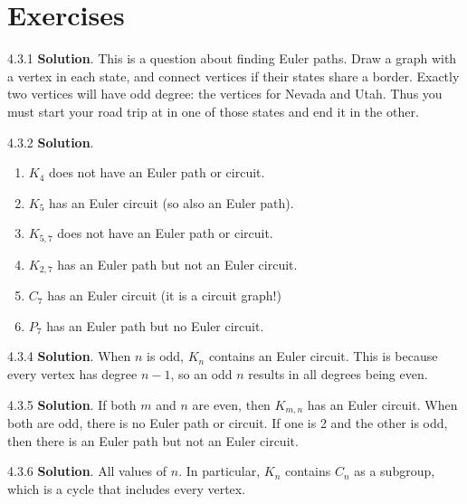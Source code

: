 \documentclass[11pt,]{book}
\theoremstyle{ptxplainnotitle}
\theoremstyle{ptxplaintitle}
\theoremstyle{ptxdefinitionnotitle}
\theoremstyle{ptxdefinitiontitle}
\theoremstyle{ptxdefinitionnotitle}
\theoremstyle{ptxdefinitiontitle}
\theoremstyle{ptxdefinitionnotitle}
\theoremstyle{ptxdefinitiontitle}
\theoremstyle{ptxdefinitiontitlenonumber}
\theoremstyle{ptxdefinitiontitlenonumber}
\numberwithin{equation}{chapter}
\begin{document}
\section*{Exercises}
\begin{divisionexercise}{4.3.1}
\textbf{Solution}.\quad%
\hypertarget{p-2746}{}%
This is a question about finding Euler paths. Draw a graph with a vertex in each state, and connect vertices if their states share a border. Exactly two vertices will have odd degree: the vertices for Nevada and Utah. Thus you must start your road trip at in one of those states and end it in the other.%
\end{divisionexercise}%
\begin{divisionexercise}{4.3.2}
\textbf{Solution}.\quad%
\hypertarget{p-2748}{}%
\leavevmode%
\begin{enumerate}[label=(\alph*)]
\item\hypertarget{li-1326}{}\(K_4\) does not have an Euler path or circuit.%
\item\hypertarget{li-1327}{}\(K_5\) has an Euler circuit (so also an Euler path).%
\item\hypertarget{li-1328}{}\(K_{5,7}\) does not have an Euler path or circuit.%
\item\hypertarget{li-1329}{}\(K_{2,7}\) has an Euler path but not an Euler circuit.%
\item\hypertarget{li-1330}{}\(C_7\) has an Euler circuit (it is a circuit graph!)%
\item\hypertarget{li-1331}{}\(P_7\) has an Euler path but no Euler circuit.%
\end{enumerate}
%
\end{divisionexercise}%
\begin{divisionexercise}{4.3.4}
\textbf{Solution}.\quad%
\hypertarget{p-2755}{}%
When \(n\) is odd, \(K_n\) contains an Euler circuit. This is because every vertex has degree \(n-1\), so an odd \(n\) results in all degrees being even.%
\end{divisionexercise}%
\begin{divisionexercise}{4.3.5}
\textbf{Solution}.\quad%
\hypertarget{p-2757}{}%
If both \(m\) and \(n\) are even, then \(K_{m,n}\) has an Euler circuit. When both are odd, there is no Euler path or circuit. If one is 2 and the other is odd, then there is an Euler path but not an Euler circuit.%
\end{divisionexercise}%
\begin{divisionexercise}{4.3.6}
\textbf{Solution}.\quad%
\hypertarget{p-2759}{}%
All values of \(n\). In particular, \(K_n\) contains \(C_n\) as a subgroup, which is a cycle that includes every vertex.%
\end{divisionexercise}%
\end{document}
